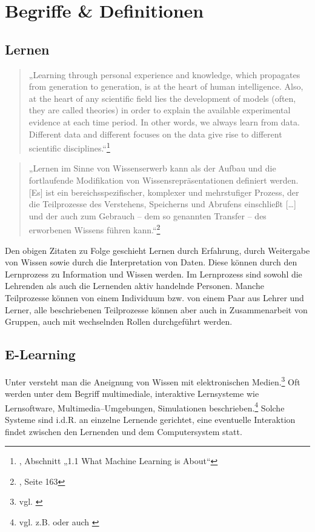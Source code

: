 \section{Begriffe \& Definitionen} %
\label{sec:definitionen}

\subsection{Lernen} %
\label{sub:lernen}
\begin{quote}„Learning through personal experience and knowledge, which propagates from generation to generation, is at the heart of human intelligence. Also, at the heart of any scientific field lies the development of models (often, they are called theories) in order to explain the available experimental evidence at each time period. In other words, we always learn from data. Different data and different focuses on the data give rise to different scientific disciplines.“\footnote{\cite{mlearning}, Abschnitt „1.1 What Machine Learning is About“}
\end{quote}

\begin{quote}„Lernen im Sinne von Wissenserwerb kann als der Aufbau und die fortlaufende Modifikation von Wissensrepräsentationen definiert werden. [Es] ist ein bereichsspezifischer, komplexer und mehrstufiger Prozess, der die Teilprozesse des Verstehens, Speicherns und Abrufens einschließt […] und der auch zum Gebrauch – dem so genannten Transfer – des erworbenen Wissens führen kann.“\footnote{\cite{steiner}, Seite 163}
\end{quote}

Den obigen Zitaten zu Folge geschieht Lernen durch Erfahrung, durch Weitergabe von Wissen sowie durch die Interpretation von Daten. Diese können durch den Lernprozess zu Information und Wissen werden. Im Lernprozess sind sowohl die Lehrenden als auch die Lernenden aktiv handelnde Personen. Manche Teilprozesse können von einem Individuum bzw. von einem Paar aus Lehrer und Lerner, alle beschriebenen Teilprozesse können aber auch in Zusammenarbeit von Gruppen, auch mit wechselnden Rollen durchgeführt werden.

\subsection{E-Learning} %
\label{sub:e_learning}
Unter  versteht man die Aneignung von Wissen mit elektronischen Medien.\footnote{vgl. \cite{gabler:elearning}} Oft werden unter dem Begriff multimediale, interaktive Lernsysteme wie Lernsoftware, Multimedia–Umgebungen, Simulationen beschrieben.\footnote{vgl. z.B. \cite{schulmeister} oder auch \cite{euler}} Solche Systeme sind i.d.R. an einzelne Lernende gerichtet, eine eventuelle Interaktion findet zwischen den Lernenden und dem Computersystem statt.

